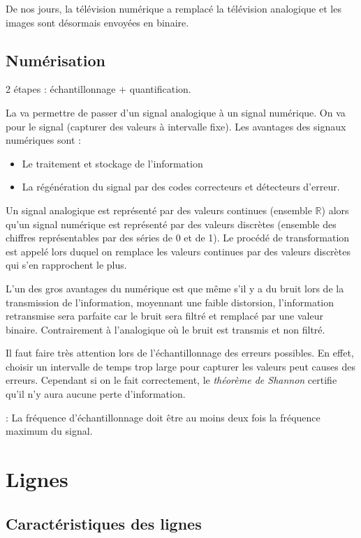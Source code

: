 De nos jours, la télévision numérique a remplacé la télévision analogique et les images sont désormais envoyées en binaire.

\section{Numérisation}

2 étapes : échantillonnage + quantification.

La  va permettre de passer d'un signal analogique à un signal numérique. On va pour  le signal (capturer des valeurs à intervalle fixe). Les avantages des signaux numériques sont :
\begin{itemize}
\item Le traitement et stockage de l'information
\item La régénération du signal par des codes correcteurs et détecteurs d'erreur.
\end{itemize}

Un signal analogique est représenté par des valeurs continues (ensemble $\mathbb{R}$) alors qu'un signal numérique est représenté par des valeurs discrètes (ensemble des chiffres représentables par des séries de 0 et de 1). Le procédé de transformation est appelé  lors duquel on remplace les valeurs continues par des valeurs discrètes qui s'en rapprochent le plus.

L'un des gros avantages du numérique est que même s'il y a du bruit lors de la transmission de l'information, moyennant une faible distorsion, l'information retransmise sera parfaite car le bruit sera filtré et remplacé par une valeur binaire. Contrairement à l'analogique où le bruit est transmis et non filtré.

Il faut faire très attention lors de l'échantillonnage des erreurs possibles. En effet, choisir un intervalle de temps trop large pour capturer les valeurs peut causes des erreurs. Cependant si on le fait correctement, le \textit{théorème de Shannon} certifie qu'il n'y aura aucune perte d'information.

 : La fréquence d'échantillonnage doit être au moins deux fois la fréquence maximum du signal.

\chapter{Lignes}

\section{Caractéristiques des lignes}

